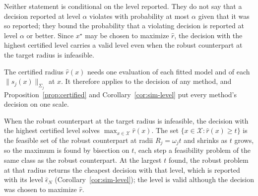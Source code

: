 Neither statement is conditional on the level reported. They do not say that
a decision reported at level $\alpha$ violates with probability at most
$\alpha$ given that it was so reported; they bound the probability that a
violating decision is reported at level $\alpha$ or better. Since $x^\star$
may be chosen to maximize $\hat r$, the decision with the highest certified
level carries a valid level even when the robust counterpart at the target
radius is infeasible.


The certified radius $\hat r(x)$ needs one evaluation of each fitted model and
of each $\|s_j(x)\|_{\Sigma_j}$ at $x$. It therefore applies to the decision
of any method, and Proposition~\ref{prop:certified} and
Corollary~\ref{cor:sim-level} put every method's decision on one scale.

When the robust counterpart at the target radius is infeasible, the decision
with the highest certified level solves $\max_{x \in \mathcal{X}} \hat r(x)$.
The set $\{x \in \mathcal{X} : \hat r(x) \ge t\}$ is the feasible set of the
robust counterpart at radii $R_j = \omega_j t$ and shrinks as $t$ grows, so
the maximum is found by bisection on $t$, each step a feasibility problem of
the same class as the robust counterpart. At the largest $t$ found, the
robust problem at that radius returns the cheapest decision with that level,
which is reported with its level $\hat\epsilon_N$
(Corollary~\ref{cor:sim-level}); the level is valid although the decision was
chosen to maximize $\hat r$.
